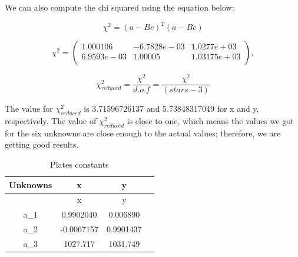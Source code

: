 \documentclass[letterpaper,12pt]{article}
\begin{document}
We can also compute the chi squared using the equation below:

\begin{equation}
\chi^2 = (a-Bc)^T(a-Bc)
\end{equation}


\begin{equation}
\chi^2= 
\begin{pmatrix}
  1.000106 & -6.7828e-03  & 1.0277e+03 \\
  6.9593e-03  & 1.00005 & 1.03175e+03 \\ 
 \end{pmatrix}, 
\end{equation}

\begin{equation}
\chi_{reduced}^2  = \frac{\chi ^ 2}{d.o.f} = \frac{\chi ^ 2}{(stars-3)}
\end{equation}

The value for \begin{math} \chi_{reduced}^2 \end{math} is 3.71596726137 and 5.73848317049 for x and y, respectively. The value of \begin{math} \chi_{reduced}^2 \end{math} is close to one, which means the values we got for the six unknowns are close enough to the actual values; therefore, we are getting good results.


\FloatBarrier
\begin{table}[h!]
\caption{Plates constants} %
\centering %
\begin{tabular}{c c c c } %
\hline\hline %
Unknowns & x & y \\ [0.5ex] %
\hline %
         & x  & y\\ %
a_{1} &   0.9902040  & 0.006890  \\
a_{2} &  -0.0067157  & 0.9901437 \\
a_{3} &  1027.717     & 1031.749\\[1ex] %
\hline %
\end{tabular}
\label{table:nonlin} %
\end{table}
\FloatBarrier
\end{document}
